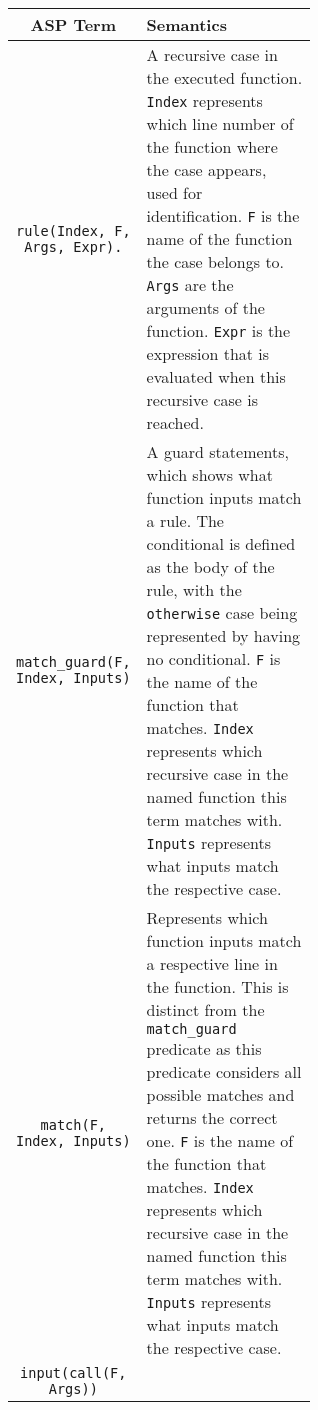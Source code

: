 \begin{longtable}[c]{| c | m{0.6\linewidth} |}
\hline
\textbf{ASP Term} & \textbf{Semantics} \\

\endhead

\hline
\lstinline!rule(Index, F, Args, Expr).! 
&
\mbox{}\newline
A recursive case in the executed function. \newline
\lstinline!Index! represents which line number of the function where the case appears, used for identification.\newline
\lstinline!F! is the name of the function the case belongs to. \newline
\lstinline!Args! are the arguments of the function.\newline
\lstinline!Expr! is the expression that is evaluated when this recursive case is reached.\newline
\\
\hline
\lstinline!match_guard(F, Index, Inputs)! 
&
\mbox{}\newline
A guard statements, which shows what function inputs match a rule. The conditional is defined as the body of the rule, with the \lstinline!otherwise! case being represented by having no conditional. \newline
\lstinline!F! is the name of the function that matches. \newline
\lstinline!Index! represents which recursive case in the named function this term matches with. \newline
\lstinline!Inputs! represents what inputs match the respective case.\newline
\\
\hline
\lstinline!match(F, Index, Inputs)! 
&
\mbox{}\newline
Represents which function inputs match a respective line in the function. This is distinct from the \lstinline!match_guard! predicate as this predicate considers all possible matches and returns the correct one. \newline
\lstinline!F! is the name of the function that matches. \newline
\lstinline!Index! represents which recursive case in the named function this term matches with. \newline
\lstinline!Inputs! represents what inputs match the respective case.\newline
\\
\hline
\lstinline!input(call(F, Args))!
&
\mbox{}\newline

\end{longtable}
